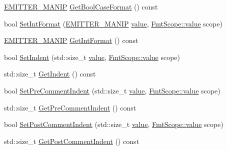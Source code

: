 \begin{DoxyCompactItemize}
\item 
\mbox{\hyperlink{namespace_y_a_m_l_a67c320aa50d3de7ecba1d0b8775dd684}{E\+M\+I\+T\+T\+E\+R\+\_\+\+M\+A\+N\+IP}} \mbox{\hyperlink{class_y_a_m_l_1_1_emitter_state_a43ed51a2432f101777044d97af0136f6}{Get\+Bool\+Case\+Format}} () const
\item 
bool \mbox{\hyperlink{class_y_a_m_l_1_1_emitter_state_a00e09382a29d3eaaec8f667973002eea}{Set\+Int\+Format}} (\mbox{\hyperlink{namespace_y_a_m_l_a67c320aa50d3de7ecba1d0b8775dd684}{E\+M\+I\+T\+T\+E\+R\+\_\+\+M\+A\+N\+IP}} \mbox{\hyperlink{glad_8h_a03aff08f73d7fde3d1a08e0abd8e84fa}{value}}, \mbox{\hyperlink{struct_y_a_m_l_1_1_fmt_scope_a58c967eadfafdc79f62cd5c59ec2b1fe}{Fmt\+Scope\+::value}} scope)
\item 
\mbox{\hyperlink{namespace_y_a_m_l_a67c320aa50d3de7ecba1d0b8775dd684}{E\+M\+I\+T\+T\+E\+R\+\_\+\+M\+A\+N\+IP}} \mbox{\hyperlink{class_y_a_m_l_1_1_emitter_state_a13a301c5d3a3799de2d98d0ca2d356a5}{Get\+Int\+Format}} () const
\item 
bool \mbox{\hyperlink{class_y_a_m_l_1_1_emitter_state_abf3b260c8f784b77ee6405d1dbcba85c}{Set\+Indent}} (std\+::size\+\_\+t \mbox{\hyperlink{glad_8h_a03aff08f73d7fde3d1a08e0abd8e84fa}{value}}, \mbox{\hyperlink{struct_y_a_m_l_1_1_fmt_scope_a58c967eadfafdc79f62cd5c59ec2b1fe}{Fmt\+Scope\+::value}} scope)
\item 
std\+::size\+\_\+t \mbox{\hyperlink{class_y_a_m_l_1_1_emitter_state_a7a4866479b0e6e1fcc58de790fee61cf}{Get\+Indent}} () const
\item 
bool \mbox{\hyperlink{class_y_a_m_l_1_1_emitter_state_a788bafd6b1ffc8a89d7179513f0261fb}{Set\+Pre\+Comment\+Indent}} (std\+::size\+\_\+t \mbox{\hyperlink{glad_8h_a03aff08f73d7fde3d1a08e0abd8e84fa}{value}}, \mbox{\hyperlink{struct_y_a_m_l_1_1_fmt_scope_a58c967eadfafdc79f62cd5c59ec2b1fe}{Fmt\+Scope\+::value}} scope)
\item 
std\+::size\+\_\+t \mbox{\hyperlink{class_y_a_m_l_1_1_emitter_state_a21d540fa26b3cb55fd79c4d68d409572}{Get\+Pre\+Comment\+Indent}} () const
\item 
bool \mbox{\hyperlink{class_y_a_m_l_1_1_emitter_state_abc3cb1c6667f6c7ad6f2720235e96c9b}{Set\+Post\+Comment\+Indent}} (std\+::size\+\_\+t \mbox{\hyperlink{glad_8h_a03aff08f73d7fde3d1a08e0abd8e84fa}{value}}, \mbox{\hyperlink{struct_y_a_m_l_1_1_fmt_scope_a58c967eadfafdc79f62cd5c59ec2b1fe}{Fmt\+Scope\+::value}} scope)
\item 
std\+::size\+\_\+t \mbox{\hyperlink{class_y_a_m_l_1_1_emitter_state_af9deed997b693b6cf736471a23f9129b}{Get\+Post\+Comment\+Indent}} () const

\end{DoxyCompactItemize}
